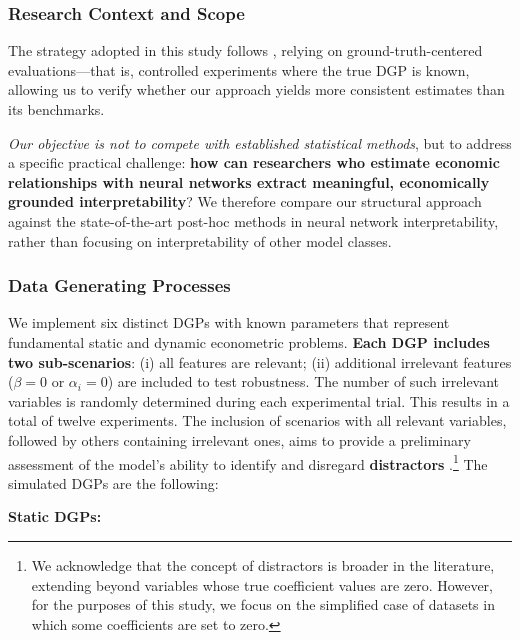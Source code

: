 \documentclass[preprint,12pt,authoryear]{sn-jnl}
\begin{document}
\subsubsection{Research Context and Scope}

The strategy adopted in this study follows \cite{wilming2022scrutinizing}, relying on ground-truth-centered evaluations—that is, controlled experiments where the true DGP is known, allowing us to verify whether our approach yields more consistent estimates than its benchmarks. 

\textit{Our objective is not to compete with established statistical methods}, but to address a specific practical challenge: \textbf{how can researchers who estimate economic relationships with neural networks extract meaningful, economically grounded interpretability}? We therefore compare our structural approach against the state-of-the-art post-hoc methods in neural network interpretability, rather than focusing on interpretability of other model classes.

\subsubsection{Data Generating Processes}

We implement six distinct DGPs with known parameters that represent fundamental static and dynamic econometric problems. \textbf{Each DGP includes two sub-scenarios}: (i) all features are relevant; (ii) additional irrelevant features ($\beta = 0$ or $\alpha_i = 0$) are included to test robustness. The number of such irrelevant variables is randomly determined during each experimental trial. This results in a total of twelve experiments. The inclusion of scenarios with all relevant variables, followed by others containing irrelevant ones, aims to provide a preliminary assessment of the model’s ability to identify and disregard \textbf{distractors} \citep{wilming2022scrutinizing}.\footnote{We acknowledge that the concept of distractors is broader in the literature, extending beyond variables whose true coefficient values are zero. However, for the purposes of this study, we focus on the simplified case of datasets in which some coefficients are set to zero.} The simulated DGPs are the following:

\textbf{Static DGPs:}
\end{document}
